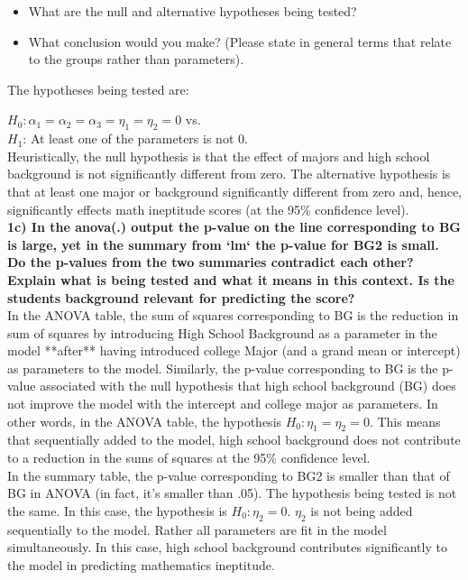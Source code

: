 \documentclass[11pt]{article}
\begin{document}
\noindent
\begin{itemize}
  \item What are the null and alternative hypotheses being tested?
  \item What conclusion would you make? (Please state in general terms that relate to the groups rather than parameters).
\end{itemize}

\noindent The hypotheses being tested are:

\noindent
$H_0: \alpha_1 = \alpha_2 = \alpha_3 = \eta_1 = \eta_2 = 0$ vs.\\
\noindent
$H_1$: At least one of the parameters is not 0.\\

\noindent
Heuristically, the null hypothesis is that the effect of majors and high school
background is not significantly different from zero. The alternative hypothesis
is that at least one major or background significantly different from zero and,
hence, significantly effects math ineptitude scores (at the 95\% confidence
level).\\

\noindent
\textbf{1c) In the anova(.) output the p-value on the line corresponding to BG is
large, yet in the summary from `lm` the p-value for BG2 is small. Do the
p-values from the two summaries contradict each other? Explain what is being
tested and what it means in this context. Is the students background relevant
for predicting the score?}\\

\noindent
In the ANOVA table, the sum of squares corresponding to BG is the reduction in
sum of squares by introducing High School Background as a parameter in the
model **after** having introduced college Major (and a grand mean or intercept)
as parameters to the model. Similarly, the p-value corresponding to BG is the
p-value associated with the null hypothesis that high school background (BG)
does not improve the model with the intercept and college major as parameters.
In other words, in the ANOVA table, the hypothesis $H_0: \eta_1 = \eta_2 = 0$.
This means that sequentially added to the model, high school background does
not contribute to a reduction in the sums of squares at the 95\% confidence
level. \\

\noindent
In the summary table, the p-value corresponding to BG2 is smaller than that of
BG in ANOVA (in fact, it's smaller than .05). The hypothesis being tested is
not the same. In this case, the hypothesis is $H_0: \eta_2 = 0$. $\eta_2$ is
not being added sequentially to the model. Rather all parameters are fit in the
model simultaneously. In this case, high school background contributes
significantly to the model in predicting mathematics ineptitude. \\
\end{document}
